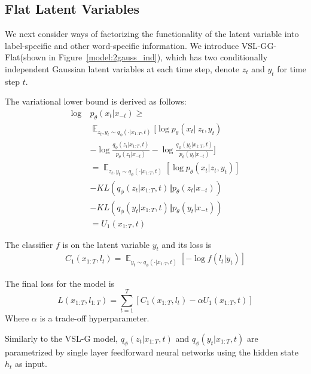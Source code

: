\documentclass[11pt,a4paper]{article}
\newcommand{\vsmggflat}{VSL-GG-Flat\xspace}
\newcommand{\kld}{\mathit{KL}}
\begin{document}
\subsection{Flat Latent Variables}
We next consider ways of factorizing the functionality of the latent variable into label-specific and other word-specific information.
We introduce \vsmggflat (shown in Figure~\ref{model:2gauss_ind}), which has two conditionally independent Gaussian latent variables at each time step, denote $z_t$ and $y_t$ for time step $t$.

The variational lower bound is derived as follows:
\begin{equation}
\begin{aligned}
    \log~&p_\theta(x_t\vert x_{-t})\geq\\
    &\mathop\mathbb{E}_{z_t,y_t\sim q_\phi(\cdot\vert x_{1:T},t)}[\log p_\theta(x_t\vert~z_t,y_t) \\&-\log\frac{q_\phi(z_t\vert x_{1:T},t)}{p_\theta(z_t\vert x_{-t})}
    -\log\frac{q_\phi(y_t\vert x_{1:T},t)}{p_\theta(y_t\vert x_{-t})}]\\
    &=\mathop\mathbb{E}_{z_t,y_t\sim q_\phi(\cdot\vert x_{1:T},t)}[\log p_\theta(x_t\vert z_t,y_t)]\\
    &-\kld(q_\phi(z_t\vert x_{1:T},t)\Vert p_\theta(z_t\vert x_{-t}))\\
    &-\kld(q_\phi(y_t\vert x_{1:T},t)\Vert p_\theta(y_t\vert x_{-t}))
    \\&=U_1(x_{1:T}, t)
\end{aligned}
\label{eq:elbo1}
\end{equation}

\noindent The classifier $f$ is on the latent variable $y_t$ and its loss is
\begin{equation}
\begin{aligned}
C_1(x_{1:T}, l_{t}) = \mathop\mathbb{E}_{y_t\sim q_\phi(\cdot\vert x_{1:T},t)}
[-\log f(l_t\vert y_t)]
\end{aligned}
\label{eq:ce1}
\end{equation}

\noindent The final loss for the model is
\begin{equation}
L(x_{1:T},l_{1:T}) = \sum_{t=1}^T[C_1(x_{1:T}, l_{t}) - \alpha U_1(x_{1:T},t)]
\end{equation}
Where $\alpha$ is a trade-off hyperparameter.

Similarly to the VSL-G model, $q_\phi(z_t\vert x_{1:T},t)$ and $q_\phi(y_t\vert x_{1:T},t)$ are parametrized by single layer feedforward neural networks using the hidden state $h_t$ as input.
\end{document}
